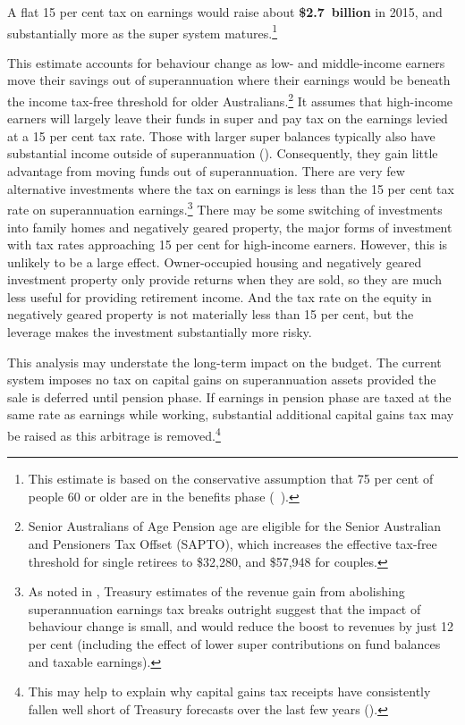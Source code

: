 A flat 15 per cent tax on earnings would raise about \textbf{\$2.7~billion} in 2015, and substantially more as the super system matures.\footnote{This estimate is based on the conservative assumption that 75 per cent of people 60 or older are in the benefits phase (\gao\ \textcite{ABS2013t}).}

This estimate accounts for behaviour change as low- and middle-income earners move their savings out of superannuation where their earnings would be beneath the income tax-free threshold for older Australians.\footnote{Senior Australians of Age Pension age are eligible for the Senior Australian and Pensioners Tax Offset (SAPTO), which increases the effective tax-free threshold for single retirees to \$32,280, and \$57,948 for couples.}  It assumes that high-income earners will largely leave their funds in super and pay tax on the earnings levied at a 15 per cent tax rate. Those with larger super balances typically also have substantial income outside of superannuation (). Consequently, they gain little advantage from moving funds out of superannuation. There are very few alternative investments where the tax on earnings is less than the 15 per cent tax rate on superannuation earnings.\footnote{As noted in , Treasury estimates of the revenue gain from abolishing superannuation earnings tax breaks outright suggest that the impact of behaviour change is small, and would reduce the boost to revenues by just 12 per cent (including the effect of lower super contributions on fund balances and taxable earnings).}  There may be some switching of investments into family homes and negatively geared property, the major forms of investment with tax rates approaching 15 per cent for high-income earners. However, this is unlikely to be a large effect. Owner-occupied housing and negatively geared investment property only provide returns when they are sold, so they are much less useful for providing retirement income. And the tax rate on the equity in negatively geared property is not materially less than 15 per cent, but the leverage makes the investment substantially more risky.%


This analysis may understate the long-term impact on the budget. The current system imposes no tax on capital gains on superannuation assets provided the sale is deferred until pension phase. If earnings in pension phase are taxed at the same rate as earnings while working, substantial additional capital gains tax may be raised as this arbitrage is removed.\footnote{This may help to explain why capital gains tax receipts have consistently fallen well short of Treasury forecasts over the last few years (\textcite[][51]{Treasury2012ReviewMacroRevenueForecasts}).}

